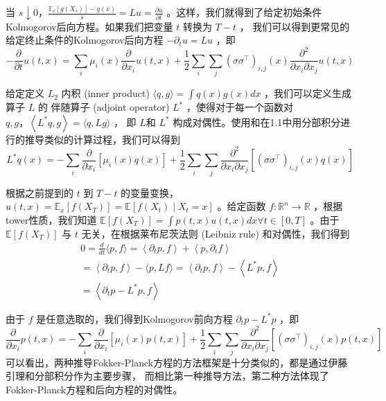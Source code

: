 \documentclass[lang=cn,newtx,10pt,scheme=chinese]{elegantbook}
\begin{document}
当 $s \downarrow 0 ， \frac{\mathbb{E}_x\left[g\left(X_s\right)\right]-g(x)}{s}=L u=\frac{\partial u}{\partial t}$ 。这样，我们就得到了给定初始条件Kolmogorov后向方程。如果我们把变量 $t$ 转换为 $T-t$ ，
我们可以得到更常见的给定终止条件的Kolmogorov后向方程 $-\partial_t u=L u$ ，即
$$
-\frac{\partial}{\partial t} u(t, x)=\sum_i \mu_i(x) \frac{\partial}{\partial x_i} u(t, x)+\frac{1}{2} \sum_i \sum_j\left(\sigma \sigma^{\top}\right)_{i, j}(x) \frac{\partial^2}{\partial x_i \partial x_j} u(t, x)
$$

给定定义 $L_2$ 内积 (inner product) $\langle q, g\rangle=\int q(x) g(x) d x$ ，我们可以定义生成算子 $L$ 的
伴随算子 (adjoint operator) $L^*$ ，使得对于每一个函数对 $q, g ，\left\langle L^* q, g\right\rangle=\langle q, L g\rangle$ ，
即 $L$和 $L^*$ 构成对偶性。使用和在1.1中用分部积分进行的推导类似的计算过程，我们可以得到
$$
L^* q(x)=-\sum_i \frac{\partial}{\partial x_i}\left[\mu_i(x) q(x)\right]+\frac{1}{2} \sum_i \sum_j \frac{\partial^2}{\partial x_i \partial x_j}\left[\left(\sigma \sigma^{\top}\right)_{i, j}(x) q(x)\right]
$$

根据之前提到的 $t$ 到 $T-t$ 的变量变换， $u(t, x)=\mathbb{E}_x\left[f\left(X_T\right)\right]=\mathbb{E}\left[f\left(X_t\right) \mid X_t=x\right]$ 。给定函数 $f: \mathbb{R}^n \rightarrow \mathbb{R}$ ，根据tower性质，我们知道 $\mathbb{E}\left[f\left(X_T\right)\right]=\int p(t, x) u(t, x) d x \forall t \in[0, T]$ 。由于 $\mathbb{E}\left[f\left(X_T\right)\right]$ 与 $t$ 无关，在根据莱布尼茨法则 (Leibniz rule) 和对偶性，我们得到
$$
\begin{gathered}
0=\frac{d}{d t}\langle p, f\rangle=\left\langle\partial_t p, f\right\rangle+\left\langle p, \partial_t f\right\rangle \\
=\left\langle\partial_t p, f\right\rangle-\langle p, L f\rangle=\left\langle\partial_t p, f\right\rangle-\left\langle L^* p, f\right\rangle \\
=\left\langle\partial_t p-L^* p, f\right\rangle
\end{gathered}
$$

由于 $f$ 是任意选取的，我们得到Kolmogorov前向方程 $\partial_t p-L^* p$ ，即
$$
\frac{\partial}{\partial x_i} p(t, x)=-\sum_i \frac{\partial}{\partial x_i}\left[\mu_i(x) p(t, x)\right]+
\frac{1}{2} \sum_i \sum_j \frac{\partial^2}{\partial x_i \partial x_j}
\left[\left(\sigma \sigma^{\top}\right)_{i, j}(x) p(t, x)\right]
$$
可以看出，两种推导Fokker-Planck方程的方法框架是十分类似的，都是通过伊藤引理和分部积分作为主要步骤，
而相比第一种推导方法，第二种方法体现了Fokker-Planck方程和后向方程的对偶性。
\end{document}
